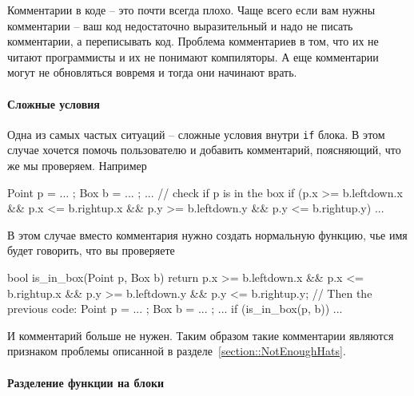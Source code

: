 Комментарии в коде -- это почти всегда плохо.
Чаще всего если вам нужны комментарии -- ваш код недостаточно выразительный и надо не писать комментарии, а переписывать код.
Проблема комментариев в том, что их не читают программисты и их не понимают компиляторы.
А еще комментарии могут не обновляться вовремя и тогда они начинают врать.

\paragraph{Сложные условия}

Одна из самых частых ситуаций -- сложные условия внутри \verb"if" блока.
В этом случае хочется помочь пользователю и добавить комментарий, поясняющий, что же мы проверяем.
Например
\begin{cppcode}
Point p = ... ;
Box b = ... ;
...
// check if p is in the box
if (p.x >= b.leftdown.x && p.x <= b.rightup.x && p.y >= b.leftdown.y && p.y <= b.rightup.y) {
  ...
}
\end{cppcode}
В этом случае вместо комментария нужно создать нормальную функцию, чье имя будет говорить, что вы проверяете
\begin{cppcode}
bool is_in_box(Point p, Box b) {
  return p.x >= b.leftdown.x && p.x <= b.rightup.x && p.y >= b.leftdown.y && p.y <= b.rightup.y;
}
// Then the previous code:
Point p = ... ;
Box b = ... ;
...
if (is_in_box(p, b)) {
  ...
}
\end{cppcode}
И комментарий больше не нужен.
Таким образом такие комментарии являются признаком проблемы описанной в разделе~\ref{section::NotEnoughHats}.

\paragraph{Разделение функции на блоки}

